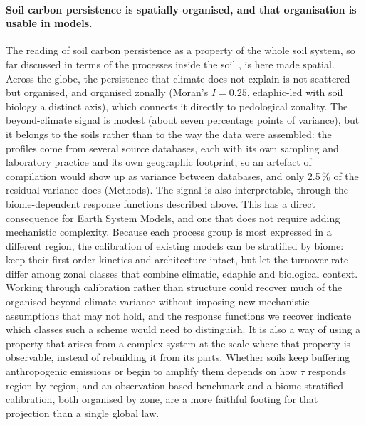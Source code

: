 \documentclass[12pt, a4paper]{article}
\begin{document}
\paragraph{Soil carbon persistence is spatially organised, and that organisation is
usable in models.}
The reading of soil carbon persistence as a property of the whole soil system, so far
discussed in terms of the processes inside the soil \citep{Schmidt2011}, is here made
spatial. Across the globe, the persistence that climate does not explain is not
scattered but organised, and organised zonally (Moran's $I=0.25$, edaphic-led with
soil biology a distinct axis), which connects it directly to pedological zonality.
The beyond-climate signal is modest (about seven percentage points of variance), but
it belongs to the soils rather than to the way the data were assembled: the profiles
come from several source databases, each with its own sampling and laboratory
practice and its own geographic footprint, so an artefact of compilation would show
up as variance between databases, and only 2.5\,\% of the residual variance does
(Methods). The signal is also interpretable, through the biome-dependent response
functions described above. This has a direct consequence for Earth System Models,
and one that does not require adding mechanistic complexity. Because each
process group is most expressed in a different region, the calibration of existing
models can be stratified by biome: keep their first-order
kinetics and architecture intact, but let the turnover rate differ among zonal
classes that combine climatic, edaphic and biological context. Working through
calibration rather than structure could recover much of the organised
beyond-climate variance without imposing new mechanistic assumptions that may not
hold, and the response functions we recover indicate which classes such
a scheme would need to distinguish. It is also a way of using a property that arises
from a complex system at the scale where that property is observable, instead of
rebuilding it from its parts.
Whether soils keep buffering anthropogenic emissions or begin to amplify them depends
on how $\tau$ responds region by region, and an observation-based benchmark and a
biome-stratified calibration, both organised by zone, are a more faithful footing for
that projection than a single global law.

\end{document}
